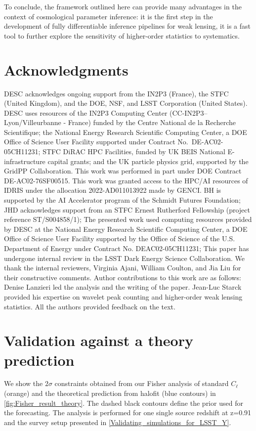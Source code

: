 \documentclass[twocolumn,twocolappendix]{aastex63}
\begin{document}
To conclude, the framework outlined here can provide many advantages in the context of cosmological parameter inference:  it is the first step in the development of fully differentiable inference pipelines for weak lensing, it is a fast tool to further explore the sensitivity of higher-order statistics to systematics. 


\section*{Acknowledgments}

DESC acknowledges ongoing support from the IN2P3 (France), the STFC 
(United Kingdom), and the DOE, NSF, and LSST Corporation (United States).  
DESC uses resources of the IN2P3 Computing Center 
(CC-IN2P3--Lyon/Villeurbanne - France) funded by the Centre National de la
Recherche Scientifique; the National Energy Research Scientific Computing
Center, a DOE Office of Science User Facility supported under Contract 
No.\ DE-AC02-05CH11231; STFC DiRAC HPC Facilities, funded by UK BEIS National 
E-infrastructure capital grants; and the UK particle physics grid, supported
by the GridPP Collaboration.  This work was performed in part under DOE 
Contract DE-AC02-76SF00515.
This work was granted access to the HPC/AI resources of IDRIS under the allocation 2022-AD011013922 made by GENCI.
BH is supported by the AI Accelerator program of the Schmidt Futures Foundation; JHD acknowledges support from an STFC Ernest Rutherford Fellowship (project reference ST/S004858/1); The presented work used computing resources provided by DESC at the National Energy Research Scientific Computing Center, a DOE Office of Science User Facility supported by the Office of Science of the U.S. Department of Energy under Contract No. DEAC02-05CH11231; 
This paper has undergone internal review in the LSST Dark Energy Science Collaboration. We thank the internal reviewers, Virginia Ajani, William Coulton, and Jia Liu for their constructive comments.
Author contributions to this work are as follows: Denise Lanzieri led the analysis and the writing of the paper.  Jean-Luc Starck provided his expertise on wavelet peak counting and higher-order weak lensing statistics. All the authors provided feedback on
the text.

\appendix


\section{Validation against a theory prediction}
We show the $2\sigma$ constraints obtained from our Fisher analysis of standard $C_{\ell}$ (orange) and the theoretical prediction from halofit (blue contours) in \autoref{fig:Fisher_result_theory}. The dashed black contours define the prior used for the forecasting.
The analysis is performed for one single source redshift at z=0.91 and the survey setup presented in \autoref{Validating_simulations_for_LSST_Y}.
\end{document}
